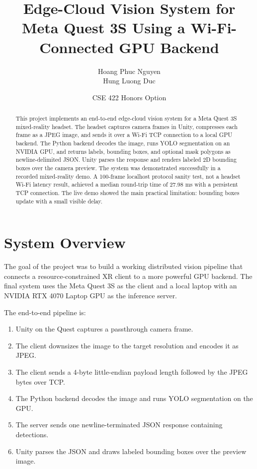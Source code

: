 \documentclass[11pt]{article}
\title{Edge-Cloud Vision System for Meta Quest 3S Using a Wi-Fi-Connected GPU Backend}
\author{Hoang Phuc Nguyen \\ Hung Luong Duc}
\date{CSE 422 Honors Option}
\begin{document}
\maketitle

\begin{abstract}
This project implements an end-to-end edge-cloud vision system for a Meta Quest 3S mixed-reality headset. The headset captures camera frames in Unity, compresses each frame as a JPEG image, and sends it over a Wi-Fi TCP connection to a local GPU backend. The Python backend decodes the image, runs YOLO segmentation on an NVIDIA GPU, and returns labels, bounding boxes, and optional mask polygons as newline-delimited JSON. Unity parses the response and renders labeled 2D bounding boxes over the camera preview. The system was demonstrated successfully in a recorded mixed-reality demo. A 100-frame localhost protocol sanity test, not a headset Wi-Fi latency result, achieved a median round-trip time of 27.98 ms with a persistent TCP connection. The live demo showed the main practical limitation: bounding boxes update with a small visible delay.
\end{abstract}

\section{System Overview}

The goal of the project was to build a working distributed vision pipeline that connects a resource-constrained XR client to a more powerful GPU backend. The final system uses the Meta Quest 3S as the client and a local laptop with an NVIDIA RTX 4070 Laptop GPU as the inference server.

The end-to-end pipeline is:

\begin{enumerate}
    \item Unity on the Quest captures a passthrough camera frame.
    \item The client downsizes the image to the target resolution and encodes it as JPEG.
    \item The client sends a 4-byte little-endian payload length followed by the JPEG bytes over TCP.
    \item The Python backend decodes the image and runs YOLO segmentation on the GPU.
    \item The server sends one newline-terminated JSON response containing detections.
    \item Unity parses the JSON and draws labeled bounding boxes over the preview image.
\end{enumerate}
\end{document}
